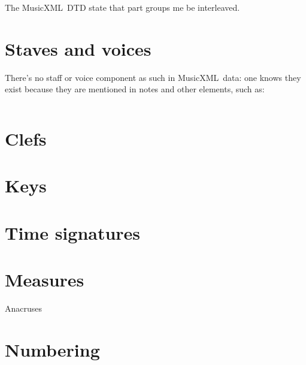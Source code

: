 \documentclass[12pt,a4paper]{article}
\newcommand{\mxml}{MusicXML}
\begin{document}
The \mxml\ DTD state that part groups me be interleaved.

\section{Staves and voices}

There's no staff or voice component as such in \mxml\ data: one knows they exist because they are mentioned in notes and other elements, such as:
\begin{lstlisting}[language=XML]

\end{lstlisting}

\section{Clefs}

 

\section{Keys}

 

\section{Time signatures}

 

\section{Measures}

Anacruses 

\section{Numbering}
\end{document}
